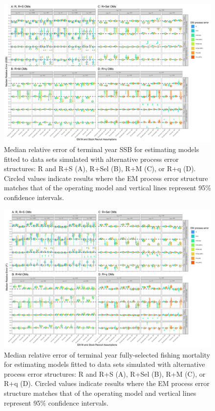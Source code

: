 \documentclass[
  12pt,
]{article}
\begin{document}
\begin{landscape}
\begin{figure}
\begin{center}
\includegraphics[width = 1.4\textwidth]{term_SSB_bias_plots}
\end{center}
\caption{Median relative error of terminal year SSB for estimating models fitted to data sets simulated with alternative process error structures: R and R+S (A), R+Sel (B), R+M (C), or R+q (D). Circled values indicate results where the EM process error structure matches that of the operating model and vertical lines represent 95\% confidence intervals.}\label{SSB_rel_error}
\end{figure}
\end{landscape}

\begin{landscape}
\begin{figure}
\begin{center}
\includegraphics[width = 1.4\textwidth]{term_F_bias_plots}
\end{center}
\caption{Median relative error of terminal year fully-selected fishing mortality for estimating models fitted to data sets simulated with alternative process error structures: R and R+S (A), R+Sel (B), R+M (C), or R+q (D). Circled values indicate results where the EM process error structure matches that of the operating model and vertical lines represent 95\% confidence intervals.}\label{F_rel_error}
\end{figure}
\end{landscape}
\end{document}
